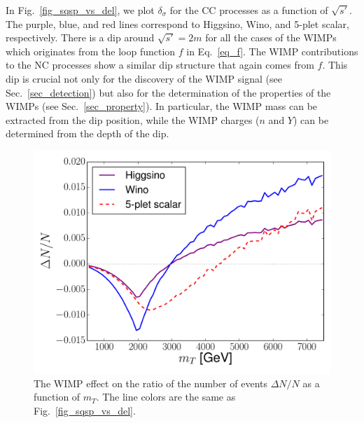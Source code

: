 \documentclass[12pt,twoside,book]{article}
\begin{document}
In Fig.~\ref{fig_sqsp_vs_del}, we plot $\delta_\sigma$ for the CC processes as a function of $\sqrt{s'}$.
The purple, blue, and red lines correspond to Higgsino, Wino, and 5-plet scalar, respectively.
There is a dip around $\sqrt{s'} = 2m$ for all the cases of the WIMPs which originates from the loop function $f$ in Eq.~\eqref{eq_f}.
The WIMP contributions to the NC processes show a similar dip structure that again comes from $f$.
This dip is crucial not only for the discovery of the WIMP signal (see Sec.~\ref{sec_detection}) but also for the determination of the properties of the WIMPs (see Sec.~\ref{sec_property}).
In particular, the WIMP mass can be extracted from the dip position, while the WIMP charges ($n$ and $Y$) can be determined from the depth of the dip.

\begin{figure}[t]
  \centering
  \includegraphics[width=0.5\hsize]{mT_vs_del.pdf}
  \caption{
    The WIMP effect on the ratio of the number of events $\Delta N / N$ as a function of $m_T$.
    The line colors are the same as Fig.~\ref{fig_sqsp_vs_del}.
  }
  \label{fig_mT_vs_dN}
\end{figure}
\end{document}
